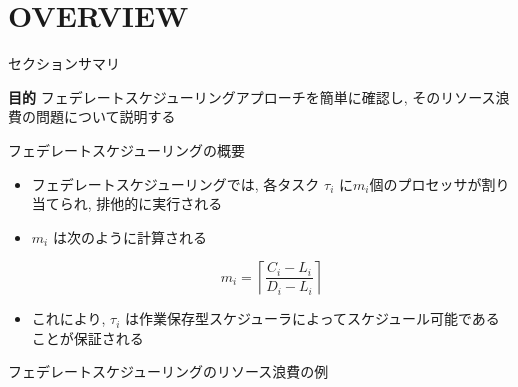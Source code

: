 
\section{OVERVIEW}
\label{sec: overview}

\begin{frame}{セクションサマリ}
    \begin{itembox}[l]{\textbf{目的}}
        フェデレートスケジューリングアプローチを簡単に確認し, そのリソース浪費の問題について説明する
    \end{itembox}
\end{frame}

\begin{frame}{フェデレートスケジューリングの概要}
    \begin{itemize}
        \item フェデレートスケジューリングでは, 各タスク $\tau_{i}$ に$m_{i}$個のプロセッサが割り当てられ, 排他的に実行される
        \item $m_{i}$ は次のように計算される

              \begin{equation*}
                  m_{i}=\left\lceil\frac{C_{i}-L_{i}}{D_{i}-L_{i}}\right\rceil
              \end{equation*}

        \item これにより, $\tau_{i}$ は作業保存型スケジューラによってスケジュール可能であることが保証される
    \end{itemize}
\end{frame}


\begin{frame}{フェデレートスケジューリングのリソース浪費の例}
\end{frame}

